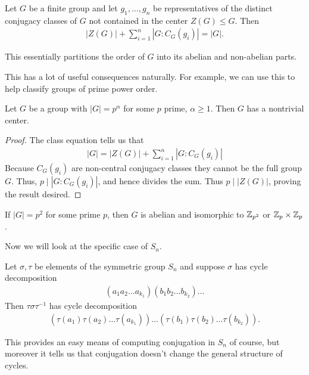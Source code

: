 \documentclass{memoir}
\begin{document}
\begin{thm}
	Let \(G\) be a finite group and let \(g_1,\ldots,g_n\) be representatives of the distinct conjugacy classes of \(G\) not contained in the center \(Z(G)\leq G\). Then
	\begin{align*}
		\left| Z(G) \right| + \sum_{i=1}^{n} \left| G : C_G(g_i) \right| = \left| G \right| .
	\end{align*}
\end{thm}
This essentially partitions the order of \(G\) into its abelian and non-abelian parts. 

This has a lot of useful consequences naturally. For example, we can use this to help classify groups of prime power order.

\begin{cor}
	Let \(G\) be a group with \(\left| G \right| = p^{\alpha }\) for some \(p\) prime, \(\alpha \geq 1\). Then \(G\) has a nontrivial center.
\end{cor}
\begin{proof}
	The class equation tells us that
	\begin{align*}
		\left| G \right|  = \left| Z(G) \right| + \sum_{i=1}^{n} \left| G:C_G(g_i) \right| 
	\end{align*}
	Because \(C_G(g_i)\) are non-central conjugacy classes they cannot be the full group \(G\). Thus, \(p\mid \left| G:C_G(g_i) \right| \), and hence divides the sum. Thus \(p\mid \left| Z(G) \right| \), proving the result desired.
\end{proof}

\begin{cor}
	If \(\left| G \right| = p^2\) for some prime \(p\), then \(G\) is abelian and isomorphic to \(\mathbb{Z}_{p^2}\) or \(\mathbb{Z}_p \times \mathbb{Z}_p\).
\end{cor}

Now we will look at the specific case of \(S_n\).

\begin{prop}
	Let \(\sigma ,\tau \) be elements of the symmetric group \(S_n\) and suppose \(\sigma \) has cycle decomposition
	\begin{align*}
		(a_1a_2\ldots a_{k_1})(b_1b_2\ldots b_{k_2})\ldots
	\end{align*}
	Then \(\tau \sigma \tau ^{-1}\) has cycle decomposition
	\begin{align*}
		(\tau (a_1)\tau (a_2)\ldots \tau (a_{k_1})) \ldots (\tau (b_1) \tau (b_2) \ldots \tau (b_{k_2})).
	\end{align*}
\end{prop}
This provides an easy means of computing conjugation in \(S_n\) of course, but moreover it tells us that conjugation doesn't change the general structure of cycles.
\end{document}
